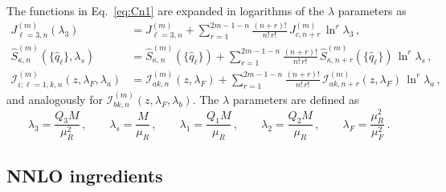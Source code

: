The functions in Eq.~\eqref{eq:Cn1} are expanded in logarithms of the $\lambda$
parameters as
\begin{subequations}
\label{eq:subt-mn-exp}
\begin{align}
    J_{\ell=3,n}^{(m)}(\lambda_3) &= J_{\ell=3,n}^{(m)}
    + \sum_{r=1}^{2m-1-n}\frac{(n+r)!}{n!\,r!}\,J_{c,n+r}^{(m)}\,\ln^r\!\lambda_3\,, \\
    \widehat{S}_{\kappa,n}^{(m)}(\{\hat{q}_\ell\},\lambda_s) &=
    \widehat{S}_{\kappa,n}^{(m)}(\{\hat{q}_\ell\})
    + \sum_{r=1}^{2m-1-n}\frac{(n+r)!}{n!\,r!}\,
    \widehat{S}_{\kappa,n+r}^{(m)}(\{\hat{q}_\ell\})\,\ln^r\!\lambda_s\,, \\
    \mathcal{I}_{i;\ell=1, k,n}^{(m)}(z,\lambda_F,\lambda_a) &=
    \mathcal{I}_{ak,n}^{(m)}(z,\lambda_F)
    + \sum_{r=1}^{2m-1-n}\frac{(n+r)!}{n!\,r!}\,
    \mathcal{I}_{ak,n+r}^{(m)}(z,\lambda_F)\,\ln^r\!\lambda_a\,,
\end{align}
\end{subequations}
and analogously for $\mathcal{I}_{bk,n}^{(m)}(z,\lambda_F,\lambda_b)$. 
The $\lambda$
parameters are defined as
\begin{equation}
    \lambda_3 = \frac{Q_3 M}{\mu_R^2}\,, \qquad
    \lambda_s = \frac{M}{\mu_R}\,, \qquad
    \lambda_1 = \frac{Q_1 M}{\mu_R}\,, \qquad
    \lambda_2 = \frac{Q_2 M}{\mu_R}\,, \qquad
    \lambda_F = \frac{\mu_R^2}{\mu_F^2}\,.
\end{equation}


\subsection{NNLO ingredients}
\label{subsec:NNLO-ingred}

